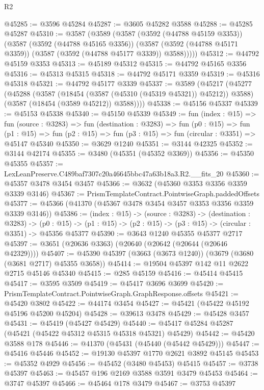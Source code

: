 \begin{lexlean}{R2}
\begin{coremodule}
@45285 := @3596 @45284
@45287 := @3605 @45282 @3588
@45288 := @45285 @45287
@45310 := @3587
    (@3589
      (@3587
        (@3592 (@44788 @45159 @3353))
        (@3587
          (@3592 (@44788 @45165 @3356))
          (@3587 (@3592 (@44788 @45171 @3359)) (@3587 (@3592 (@44788 @45177 @3339)) @3588)))))
@45312 := @44792 @45159 @3353
@45313 := @45189 @45312
@45315 := @44792 @45165 @3356
@45316 := @45313 @45315
@45318 := @44792 @45171 @3359
@45319 := @45316 @45318
@45321 := @44792 @45177 @3339
@45337 := @3589
    (@45217
      (@45277
        (@45288
          (@3587 (@18454 (@3587 (@45310 (@45319 @45321)) @45212)) @3588)
          (@3587 (@18454 (@3589 @45212)) @3588))))
@45338 := @45156 @45337
@45339 := @45153 @45338
@45340 := @45150 @45339
@45349 := fun (index : @15) =>
  fun (source : @3283) =>
  fun (destination : @3283) =>
  fun (p0 : @15) =>
  fun (p1 : @15) => fun (p2 : @15) => fun (p3 : @15) => fun (circular : @3351) => @45147 @45340
@45350 := @3629 @1240
@45351 := @3144 @42325
@45352 := @3144 @42174
@45355 := @3480 (@45351 (@45352 @3369))
@45356 := @45350 @45355
@45357 := LexLeanPreserve.C489baf7307c20a46645bbc47a63b18a3.R2.__fits_20
@45360 := @45357 @3478 @3454 @3457
@45366 := @3632 (@45360 @3353 @3356 @3359 @3339 @3146)
@45367 := PrismTemplateContract.PointwiseGraph.paddedOffsets
@45377 := @45366 (@41370 (@45367 @3478 @3454 @3457 @3353 @3356 @3359 @3339 @3146))
@45386 := (index : @15) ->
  (source : @3283) ->
  (destination : @3283) ->
  (p0 : @15) -> (p1 : @15) -> (p2 : @15) -> (p3 : @15) -> (circular : @3351) -> @45356 @45377
@45390 := @3643 @1240 @45355 @45377 @2717
@45397 := @3651 (@20636 @3363) (@20640 (@20642 (@20644 (@20646 @42329))))
@45407 := @45390 @45397 (@3663 (@3673 @1240)) (@3679 (@3680 (@3681 @2717) @45355 @3658))
@45414 := @19504 @45397 @142 @11 @2622 @2715 @45146 @45340
@45415 := @285 @45159
@45416 := @45414 @45415
@45417 := @3595 @3509
@45419 := @45417 @3696 @3699
@45420 := PrismTemplateContract.PointwiseGraph.GraphResponse.offsets
@45421 := @45420 @3802
@45422 := @44174 @3454
@45427 := @45421 (@45422 @45192 @45196 @45200 @45204)
@45428 := @39613 @3478
@45429 := @45428 @3457
@45431 := @45419 (@45427 @45429)
@45440 := @45417 @45284 @45287 (@45421 (@45422 @45312 @45315 @45318 @45321) @45429)
@45442 := @45420 @3588 @178
@45446 := @41370 (@45431 (@45440 (@45442 @45429)))
@45447 := @45416 @45446
@45452 := @19130 @45397 @1770 @2621 @3892 @45145
@45453 := @45352 @4929
@45456 := @45452 (@3480 @45453) @45415
@45457 := @3738 @45397
@45463 := @45457 @196 @2169 @3588 @3591 @3479 @45453
@45464 := @3747 @45397
@45466 := @45464 @178 @3479
@45467 := @3753 @45397

\end{coremodule}
\end{lexlean}
